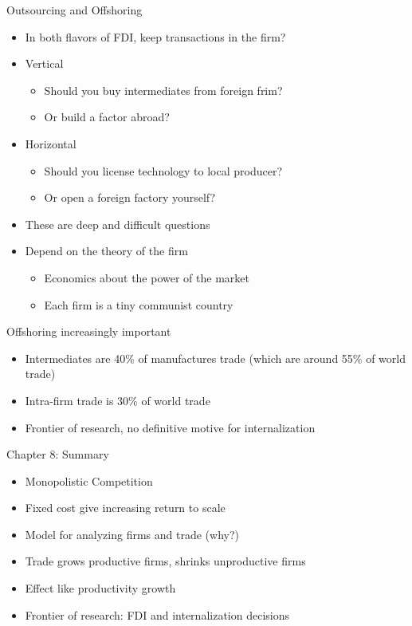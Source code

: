 \documentclass{beamer}
\begin{document}
\begin{frame}{Outsourcing and Offshoring}
    \begin{itemize}
        \item In both flavors of FDI, keep transactions in the firm?
        \item Vertical
        \begin{itemize}
            \item Should you buy intermediates from foreign frim?
            \item Or build a factor abroad?
        \end{itemize}
        \item Horizontal
        \begin{itemize}
            \item Should you license technology to local producer?
            \item Or open a foreign factory yourself?
        \end{itemize}
        \item These are deep and difficult questions
        \item Depend on the theory of the firm
        \begin{itemize}
            \item Economics about the power of the market
            \item Each firm is a tiny communist country 
        \end{itemize}
    \end{itemize}
\end{frame}

\begin{frame}{Offshoring increasingly important}

    \begin{itemize}
        \item Intermediates are 40\% of manufactures trade (which are around 55\% of world trade)
        \item Intra-firm trade is 30\% of world trade
        \item Frontier of research, no definitive motive for internalization
    \end{itemize}

\end{frame}

\begin{frame}{Chapter 8: Summary}

    \begin{itemize}
        \item Monopolistic Competition
        \item Fixed cost give increasing return to scale
        \item Model for analyzing firms and trade (why?)
        \item Trade grows productive firms, shrinks unproductive firms
        \item Effect like productivity growth
        \item Frontier of research: FDI and internalization decisions
    \end{itemize}

\end{frame}
\end{document}
